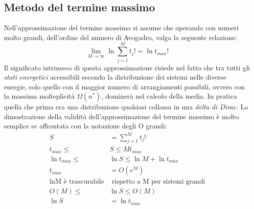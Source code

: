 \documentclass[oneside]{amsbook}
\numberwithin{section}{chapter}
\numberwithin{equation}{section}
\numberwithin{figure}{section}
\begin{document}
\subsection{Metodo del termine massimo}
Nell'approssimazione del termine massimo si assume che operando con numeri molto grandi, dell'ordine del numero di Avogadro, valga la seguente relazione:
\begin{equation}
\lim _{M\rightarrow \infty} \ln\sum_{j=1}^M t_j!=\ln t_{max}!
\end{equation}
Il significato intrinseco di questa approssimazione risiede nel fatto che tra tutti gli \emph{stati energetici} accessibili secondo la distribuzione dei sistemi nelle diverse energie, solo quello con il maggior numero di arrangiamenti possibili, ovvero con la massima molteplicità $\Omega(n^*)$, dominerà nel calcolo della media.
In pratica quella che prima era una distribuzione qualsiasi collassa in una \emph{delta di Dirac}.
La dimostrazione della validità dell'approssimazione del termine massimo è molto semplice se affrontata con la notazione degli O grandi:
\begin{equation}
\begin{aligned}
S&=\sum_{j=1}^M t_j! \\
t_{max}\leq &S \leq Mt_{max} \\
\ln t_{max}\leq &\ln S \leq \ln M + \ln t_{max} \\
t_{max}&= O(e^M)\\
\text{lnM è trascurabile} &\text{ rispetto a M per sistemi grandi}\\
O(M) \leq &\ln S \leq O(M)\\
\ln S&= \ln t_{max}
\end{aligned}
\end{equation}
\end{document}
